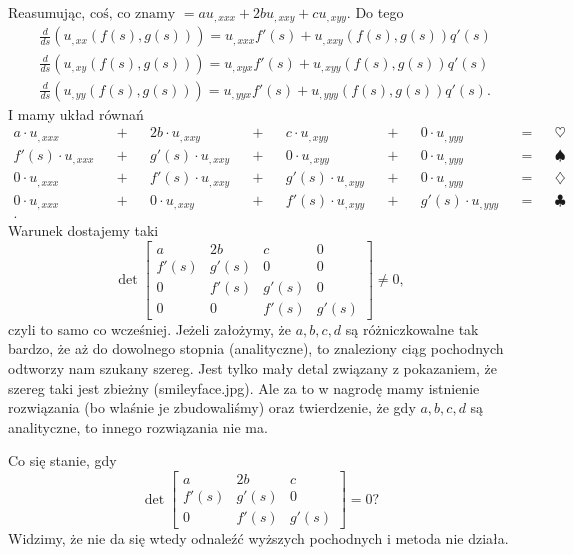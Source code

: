 \documentclass[../main.tex]{subfiles}
\begin{document}
Reasumując, $\text{coś, co znamy } = a u_{,x x x} + 2b u_{,x x y} + c u_{,x y y}.$ Do tego
\begin{align*}
		&\frac{d}{ d s}(u_{,x x}(f(s),g(s))) = u_{,x x x}f'(s) + u_{,x x y}(f(s),g(s))q'(s)\\
		&\frac{d}{d s}(u_{,xy}(f(s),g(s))) = u_{,xyx}f'(s) + u_{,xyy}(f(s),g(s))q'(s)\\
		&\frac{d}{ d s}(u_{,yy}(f(s),g(s))) = u_{,yyx}f'(s) + u_{,yyy}(f(s),g(s))q'(s)
.\end{align*}
I mamy układ równań
\begin{align*}
		a \cdot u_{,x x x} &&+&& 2b \cdot u_{,x x y} &&+&& c \cdot u_{,xyy} &&+&& 0\cdot u_{,yyy} &&=&& \heartsuit\\
		f'(s) \cdot u_{,x x x} &&+&& g'(s) \cdot u_{,x x y} &&+&& 0 \cdot u_{,xyy} &&+&& 0\cdot u_{,yyy} &&=&& \spadesuit\\
		0 \cdot u_{,x x x} &&+&& f'(s) \cdot u_{,x x y} &&+&& g'(s) \cdot u_{,xyy} &&+&& 0\cdot u_{,yyy} &&=&& \diamondsuit\\
		0 \cdot u_{,x x x} &&+&& 0 \cdot u_{,x x y} &&+&& f'(s) \cdot u_{,xyy} &&+&& g'(s)\cdot u_{,yyy} &&=&& \clubsuit\\
.\end{align*}
Warunek dostajemy taki
\[
		\det \begin{bmatrix} a&2b&c&0\\f'(s)&g'(s)&0&0\\0&f'(s)&g'(s)&0\\0&0&f'(s)&g'(s) \end{bmatrix} \neq 0
,\]
czyli to samo co wcześniej. Jeżeli założymy, że $a,b,c,d$ są różniczkowalne tak bardzo, że aż do dowolnego stopnia (analityczne), to znaleziony ciąg pochodnych odtworzy nam szukany szereg. Jest tylko mały detal związany z pokazaniem, że szereg taki jest zbieżny (smileyface.jpg). Ale za to w nagrodę mamy istnienie rozwiązania (bo wlaśnie je zbudowaliśmy) oraz twierdzenie, że gdy $a,b,c,d$ są analityczne, to innego rozwiązania nie ma.
\begin{pytanie}
		Co się stanie, gdy
		\[
				\det \begin{bmatrix} a&2b&c\\f'(s)&g'(s)&0\\0&f'(s)&g'(s) \end{bmatrix} = 0?
		\]
		Widzimy, że nie da się wtedy odnaleźć wyższych pochodnych i metoda nie działa.
\end{pytanie}
\end{document}

